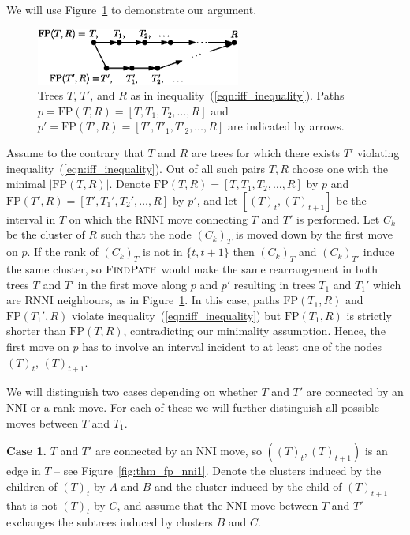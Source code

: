\documentclass{amsart}
\newcommand{\rnni}{\mathrm{RNNI}}
\newcommand{\findpath}{\textsc{FindPath}}
\newcommand{\nni}{\mathrm{NNI}}
\newcommand{\fp}{\mathrm{FP}}
\begin{document}
We will use Figure~\ref{fig:proof_idea} to demonstrate our argument.

\begin{figure}[!hbt]
\centering
\includegraphics[width=0.6\textwidth]{proof_idea_ag}
\vspace{12pt}
\caption{Trees $T$, $T'$, and $R$ as in inequality~(\ref{eqn:iff_inequality}).
Paths $p = \fp(T,R) = [T,T_1,T_2, \ldots, R]$ and $p' = \fp(T',R) = [T',T'_1,T'_2, \ldots, R]$ are indicated by arrows.}
\label{fig:proof_idea}
\end{figure}

Assume to the contrary that $T$ and $R$ are trees for which there exists $T'$ violating inequality~(\ref{eqn:iff_inequality}).
Out of all such pairs $T, R$ choose one with the minimal $|\fp(T, R)|$.
Denote $\fp(T,R) = [T, T_1, T_2, \ldots, R]$ by $p$ and $\fp(T', R) = [T', T_1', T_2', \ldots, R]$ by $p'$, and let $[(T)_t, (T)_{t+1}]$ be the interval in $T$ on which the $\rnni$ move connecting $T$ and $T'$ is performed.
Let $C_k$ be the cluster of $R$ such that the node $(C_k)_T$ is moved down by the first move on $p$.
If the rank of $(C_k)_T$ is not in $\{t, t+1\}$ then $(C_k)_T$ and $(C_k)_{T'}$ induce the same cluster, so $\findpath$ would make the same rearrangement in both trees $T$ and $T'$ in the first move along $p$ and $p'$ resulting in trees $T_1$ and $T_1'$ which are $\rnni$ neighbours, as in Figure~\ref{fig:proof_idea}.
In this case, paths $\fp(T_1, R)$ and $\fp(T_1', R)$ violate inequality~(\ref{eqn:iff_inequality}) but $\fp(T_1, R)$ is strictly shorter than $\fp(T, R)$, contradicting our minimality assumption.
Hence, the first move on $p$ has to involve an interval incident to at least one of the nodes $(T)_t$, $(T)_{t+1}$.

We will distinguish two cases depending on whether $T$ and $T'$ are connected by an $\nni$ or a rank move.
For each of these we will further distinguish all possible moves between $T$ and $T_1$.

\textbf{Case 1.} $T$ and $T'$ are connected by an $\nni$ move, so $((T)_t,(T)_{t+1})$ is an edge in $T$ -- see Figure~\ref{fig:thm_fp_nni1}.
Denote the clusters induced by the children of $(T)_t$ by $A$ and $B$ and the cluster induced by the child of $(T)_{t+1}$ that is not $(T)_t$ by $C$, and assume that the $\nni$ move between $T$ and $T'$ exchanges the subtrees induced by clusters $B$ and $C$.
\end{document}
